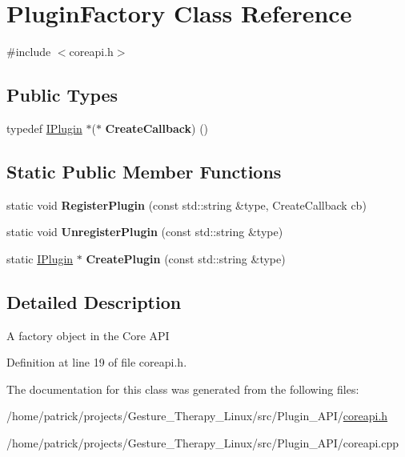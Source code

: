 \hypertarget{class_plugin_factory}{}\section{Plugin\+Factory Class Reference}
\label{class_plugin_factory}


{\ttfamily \#include $<$coreapi.\+h$>$}

\subsection*{Public Types}
\begin{DoxyCompactItemize}
\item 
\mbox{\label{class_plugin_factory_a41c268ee65f48bf9b26bdcb7e4935450}} 
typedef \hyperlink{class_i_plugin}{I\+Plugin} $\ast$($\ast$ {\bfseries Create\+Callback}) ()
\end{DoxyCompactItemize}
\subsection*{Static Public Member Functions}
\begin{DoxyCompactItemize}
\item 
\mbox{\label{class_plugin_factory_a360ceed22a62ac005d2b848ffa0a9955}} 
static void {\bfseries Register\+Plugin} (const std\+::string \&type, Create\+Callback cb)
\item 
\mbox{\label{class_plugin_factory_a7ae6fd89d1c98a27010ea9dc64d4adfc}} 
static void {\bfseries Unregister\+Plugin} (const std\+::string \&type)
\item 
\mbox{\label{class_plugin_factory_ab85d7d514d60732ecb335561effdf886}} 
static \hyperlink{class_i_plugin}{I\+Plugin} $\ast$ {\bfseries Create\+Plugin} (const std\+::string \&type)
\end{DoxyCompactItemize}


\subsection{Detailed Description}
A factory object in the Core A\+PI 

Definition at line 19 of file coreapi.\+h.



The documentation for this class was generated from the following files\+:\begin{DoxyCompactItemize}
\item 
/home/patrick/projects/\+Gesture\+\_\+\+Therapy\+\_\+\+Linux/src/\+Plugin\+\_\+\+A\+P\+I/\hyperlink{coreapi_8h}{coreapi.\+h}\item 
/home/patrick/projects/\+Gesture\+\_\+\+Therapy\+\_\+\+Linux/src/\+Plugin\+\_\+\+A\+P\+I/coreapi.\+cpp\end{DoxyCompactItemize}
